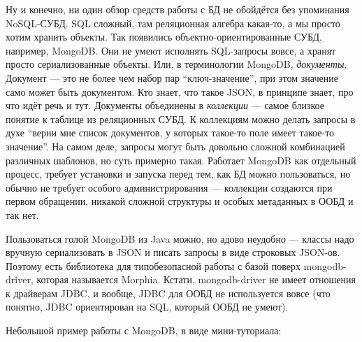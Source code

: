 \documentclass[a5paper]{article}
\begin{document}
Ну и конечно, ни один обзор средств работы с БД не обойдётся без упоминания NoSQL-СУБД. SQL сложный, там реляционная алгебра какая-то, а мы просто хотим хранить объекты. Так появились объектно-ориентированные СУБД, например, MongoDB. Они не умеют исполнять SQL-запросы вовсе, а хранят просто сериализованные объекты. Или, в терминологии MongoDB, \textit{документы}. Документ --- это не более чем набор пар ``ключ-значение'', при этом значение само может быть документом. Кто знает, что такое JSON, в принципе знает, про что идёт речь и тут. Документы объединены в \textit{коллекции} --- самое близкое понятие к таблице из реляционных СУБД. К коллекциям можно делать запросы в духе ``верни мне список документов, у которых такое-то поле имеет такое-то значение''. На самом деле, запросы могут быть довольно сложной комбинацией различных шаблонов, но суть примерно такая. Работает MongoDB как отдельный процесс, требует установки и запуска перед тем, как БД можно пользоваться, но обычно не требует особого администрирования --- коллекции создаются при первом обращении, никакой сложной структуры и особых метаданных в ООБД и так нет.

Пользоваться голой MongoDB из Java можно, но адово неудобно --- классы надо вручную сериализовать в JSON и писать запросы в виде строковых JSON-ов. Поэтому есть библиотека для типобезопасной работы с базой поверх mongodb-driver, которая называется Morphia. Кстати, mongodb-driver не имеет отношения к драйверам JDBC, и вообще, JDBC для ООБД не используется вовсе (что понятно, JDBC ориентирован на SQL, который ООБД не умеют).

Небольшой пример работы с MongoDB, в виде мини-туториала:
\end{document}
